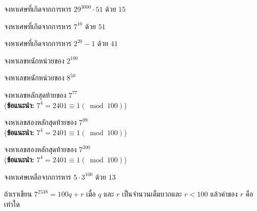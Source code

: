 \begin{examplebox}
	จงหาเศษที่เกิดจากการหาร $29^{3000}\cdot 51$ ด้วย $15$  
\end{examplebox}
\solution  
\newpage

\begin{examplebox}
	จงหาเศษที่เกิดจากการหาร $7^{10}$ ด้วย $51$     
\end{examplebox}
\solution
\newpage

\begin{examplebox}
	จงหาเศษที่เกิดจากการหาร $2^{20}-1$ ด้วย $41$
\end{examplebox}
\solution 
\newpage

\begin{examplebox}
	จงหาเลขหนักหน่วยของ $2^{100}$   
\end{examplebox}
\solution
\newpage

\begin{examplebox}
	จงหาเลขหนักหน่วยของ $8^{50}$ 
\end{examplebox}
\solution  
\newpage


\begin{examplebox}
	จงหาเลขหลักสุดท้ายของ $7^{77}$\\
	(\textbf{ข้อแนะนำ:} $7^{4}=2401 \equiv 1(\bmod 100)$)\\    
\end{examplebox}
\solution
\newpage


\begin{examplebox}
	จงหาเลขสองหลักสุดท้ายของ $7^{99}$\\
	(\textbf{ข้อแนะนำ:} $7^{4}=2401 \equiv 1(\bmod 100)$)\\ 
\end{examplebox}
\solution   
\newpage

\begin{examplebox}
	จงหาเลขสองหลักสุดท้ายของ $7^{300}$\\
	(\textbf{ข้อแนะนำ:} $7^{4}=2401 \equiv 1(\bmod 100)$)   
\end{examplebox}
\solution
\newpage


\begin{examplebox}
	จงหาเศษเหลือจากการหาร $5\cdot 3^{100}$ ด้วย $13$ 
\end{examplebox}
\solution  
\newpage

\begin{examplebox}
	ถ้าเราเขียน $7^{2538}=100q+r$ เมื่อ $q$ และ $r$ เป็นจำนวนเต็มบวกและ $r<100$ แล้วค่าของ $r$ คือเท่าใด   
\end{examplebox}
\solution
\newpage


